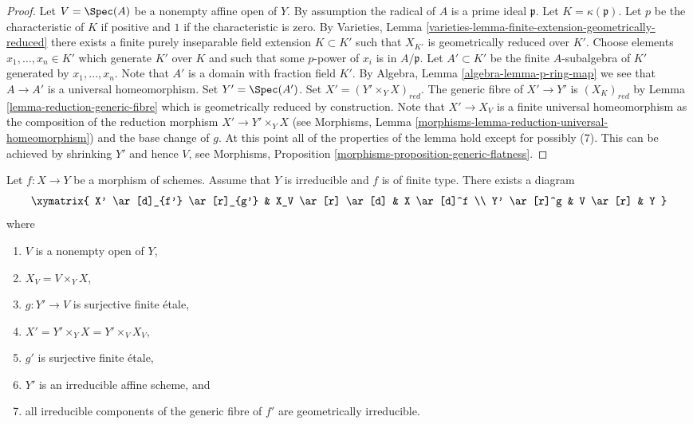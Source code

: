 \begin{proof}
Let $V = \Spec(A)$ be a nonempty affine open of $Y$.
By assumption the radical of $A$ is a prime ideal $\mathfrak p$.
Let $K = \kappa(\mathfrak p)$.
Let $p$ be the characteristic of $K$ if positive and $1$
if the characteristic is zero. By
Varieties, Lemma \ref{varieties-lemma-finite-extension-geometrically-reduced}
there exists a finite purely inseparable field extension
$K \subset K'$ such that $X_{K'}$ is geometrically reduced over $K'$.
Choose elements $x_1, \ldots, x_n \in K'$ which generate $K'$ over
$K$ and such that some $p$-power of $x_i$ is in $A/\mathfrak p$.
Let $A' \subset K'$ be the finite $A$-subalgebra of $K'$ generated by
$x_1, \ldots, x_n$. Note that $A'$ is a domain with fraction field $K'$. By
Algebra, Lemma \ref{algebra-lemma-p-ring-map}
we see that $A \to A'$ is a universal homeomorphism.
Set $Y' = \Spec(A')$. Set $X' = (Y' \times_Y X)_{red}$.
The generic fibre of $X' \to Y'$ is $(X_K)_{red}$ by
Lemma \ref{lemma-reduction-generic-fibre}
which is geometrically reduced by construction.
Note that $X' \to X_V$ is a finite universal homeomorphism as the
composition of the reduction morphism $X' \to Y' \times_Y X$ (see
Morphisms, Lemma \ref{morphisms-lemma-reduction-universal-homeomorphism})
and the base change of $g$.
At this point all of the properties of the lemma hold except for
possibly (7). This can be achieved by shrinking $Y'$ and hence $V$, see
Morphisms, Proposition \ref{morphisms-proposition-generic-flatness}.
\end{proof}

\begin{lemma}
\label{lemma-make-components-generic-fibre-geometrically-irreducible}
Let $f : X \to Y$ be a morphism of schemes.
Assume that $Y$ is irreducible and $f$ is of finite type.
There exists a diagram
$$
\xymatrix{
X' \ar[d]_{f'} \ar[r]_{g'} & X_V \ar[r] \ar[d] & X \ar[d]^f \\
Y' \ar[r]^g & V \ar[r] & Y
}
$$
where
\begin{enumerate}
\item $V$ is a nonempty open of $Y$,
\item $X_V = V \times_Y X$,
\item $g : Y' \to V$ is surjective finite \'etale,
\item $X' = Y' \times_Y X = Y' \times_V X_V$,
\item $g'$ is surjective finite \'etale,
\item $Y'$ is an irreducible affine scheme, and
\item all irreducible components of the generic fibre of $f'$
are geometrically irreducible.
\end{enumerate}
\end{lemma}

